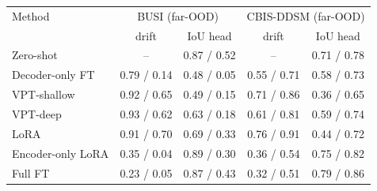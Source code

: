 \begin{tabular}{lcccc}
\toprule
Method & \multicolumn{2}{c}{BUSI (far-OOD)} & \multicolumn{2}{c}{CBIS-DDSM (far-OOD)} \\
 & drift & IoU head & drift & IoU head \\
\midrule
Zero-shot & -- & 0.87 / 0.52 & -- & 0.71 / 0.78 \\
Decoder-only FT & 0.79 / 0.14 & 0.48 / 0.05 & 0.55 / 0.71 & 0.58 / 0.73 \\
VPT-shallow & 0.92 / 0.65 & 0.49 / 0.15 & 0.71 / 0.86 & 0.36 / 0.65 \\
VPT-deep & 0.93 / 0.62 & 0.63 / 0.18 & 0.61 / 0.81 & 0.59 / 0.74 \\
LoRA & 0.91 / 0.70 & 0.69 / 0.33 & 0.76 / 0.91 & 0.44 / 0.72 \\
Encoder-only LoRA & 0.35 / 0.04 & 0.89 / 0.30 & 0.36 / 0.54 & 0.75 / 0.82 \\
Full FT & 0.23 / 0.05 & 0.87 / 0.43 & 0.32 / 0.51 & 0.79 / 0.86 \\
\bottomrule
\end{tabular}

